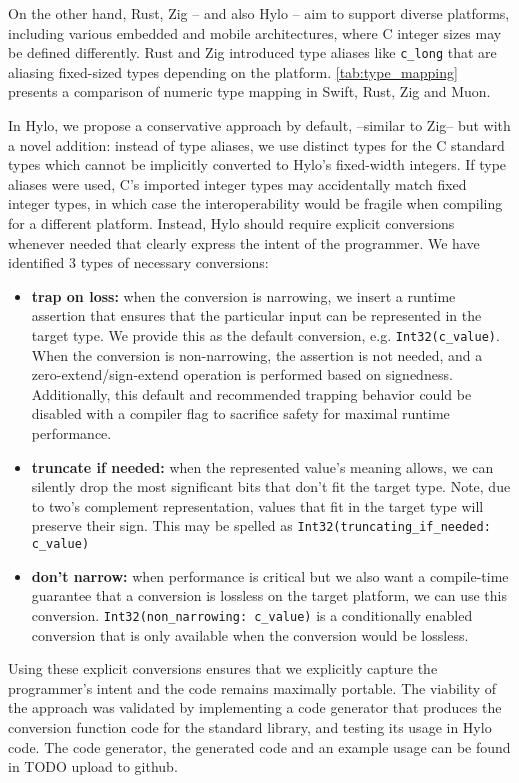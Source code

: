 On the other hand, Rust, Zig -- and also Hylo -- aim to support diverse platforms, including various embedded and mobile architectures, where C integer sizes may be defined differently. Rust and Zig introduced type aliases like \texttt{c\_long} that are aliasing fixed-sized types depending on the platform. \autoref{tab:type_mapping} presents a comparison of numeric type mapping in Swift, Rust, Zig and Muon. 



In Hylo, we propose a conservative approach by default, --similar to Zig-- but with a novel addition: instead of type aliases, we use distinct types for the C standard types which cannot be implicitly converted to Hylo's fixed-width integers. If type aliases were used, C's imported integer types may accidentally match fixed integer types, in which case the interoperability would be fragile when compiling for a different platform. Instead, Hylo should require explicit conversions whenever needed that clearly express the intent of the programmer. We have identified 3 types of necessary conversions:
\begin{itemize}
    \item \textbf{trap on loss:} when the conversion is narrowing, we insert a runtime assertion that ensures that the particular input can be represented in the target type. We provide this as the default conversion, e.g. \texttt{Int32(c\_value)}. When the conversion is non-narrowing, the assertion is not needed, and a zero-extend/sign-extend operation is performed based on signedness. Additionally, this default and recommended trapping behavior could be disabled with a compiler flag to sacrifice safety for maximal runtime performance.
    \item \textbf{truncate if needed:} when the represented value's meaning allows, we can silently drop the most significant bits that don't fit the target type. Note, due to two's complement representation, values that fit in the target type will preserve their sign. This may be spelled as \texttt{Int32(truncating\_if\_needed: c\_value)}
    \item \textbf{don't narrow:} when performance is critical but we also want a compile-time guarantee that a conversion is lossless on the target platform, we can use this conversion. \texttt{Int32(non\_narrowing: c\_value)} is a conditionally enabled conversion that is only available when the conversion would be lossless.
\end{itemize}
Using these explicit conversions ensures that we explicitly capture the programmer's intent and the code remains maximally portable. The viability of the approach was validated by implementing a code generator that produces the conversion function code for the standard library, and testing its usage in Hylo code. The code generator, the generated code and an example usage can be found in TODO upload to github.


